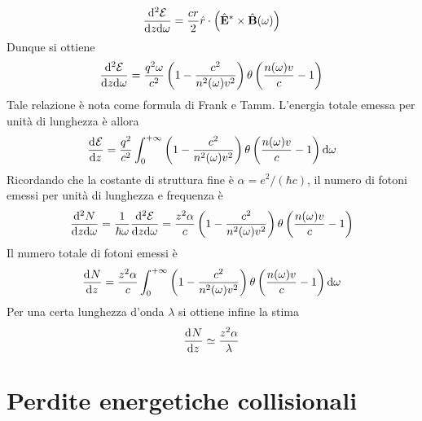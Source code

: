 \documentclass{article}
\begin{document}
\[\frac{\mathrm{d} ^2\mathcal{E}}{\mathrm{d} z\mathrm{d} \omega}=\frac{cr}{2}\hat{r}\cdot\left(\hat{\mathbf{E}}^*\times\hat{\mathbf{B}}(\omega)\right)\]
Dunque si ottiene
\[\frac{\mathrm{d} ^2\mathcal{E}}{\mathrm{d} z\mathrm{d} \omega}=\frac{q^2\omega}{c^2}\left(1-\frac{c^2}{n^2(\omega)v^2}\right)\theta\left(\frac{n(\omega)v}{c}-1\right)\]
Tale relazione è nota come formula di Frank e Tamm. L'energia totale emessa per unità di lunghezza è allora
\[\dfrac{\mathrm{d} ^{}\mathcal{E}}{\mathrm{d} {z}^{}}=\frac{q^2}{c^2}\int_{0}^{+\infty}\left(1-\frac{c^2}{n^2(\omega)v^2}\right)\theta\left(\frac{n(\omega)v}{c}-1\right)\mathrm{d} \omega\]
Ricordando che la costante di struttura fine è $\alpha=e^2/(\hbar c)$, il numero di fotoni emessi per unità di lunghezza e frequenza è
\[\frac{\mathrm{d} ^2N}{\mathrm{d} z\mathrm{d} \omega}=\frac{1}{\hbar\omega}\frac{\mathrm{d} ^2\mathcal{E}}{\mathrm{d} z\mathrm{d} \omega}=\frac{z^2\alpha}{c}\left(1-\frac{c^2}{n^2(\omega)v^2}\right)\theta\left(\frac{n(\omega)v}{c}-1\right)\]
Il numero totale di fotoni emessi è
\[\dfrac{\mathrm{d} ^{}N}{\mathrm{d} {z}^{}}=\frac{z^2\alpha}{c}\int_{0}^{+\infty}\left(1-\frac{c^2}{n^2(\omega)v^2}\right)\theta\left(\frac{n(\omega)v}{c}-1\right)\mathrm{d} \omega\]
Per una certa lunghezza d'onda $\lambda$ si ottiene infine la stima
\[\dfrac{\mathrm{d} ^{}N}{\mathrm{d} {z}^{}}\simeq\frac{z^2\alpha}{\lambda}\]
\section{Perdite energetiche collisionali}
\end{document}
